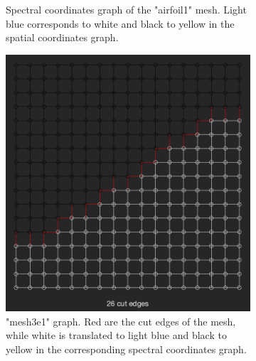 \documentclass[unicode,11pt,a4paper,oneside,numbers=endperiod,openany]{scrartcl}
\begin{document}
\begin{figure}[H]
\begin{subfigure}[b]{0.475\textwidth}
            {{\small Spectral coordinates graph of the "airfoil1" mesh.  Light blue corresponds to white and black to yellow in the spatial coordinates graph.}}    
        \end{subfigure}
\label{figure:ex61meshes}
    \end{figure}

\begin{figure}[H]
        \centering
\begin{subfigure}[b]{0.475\textwidth}   
            \centering 
            \includegraphics[width=\textwidth]{mesh3e1.png}
            {{\small "mesh3e1" graph. Red are the cut edges of the mesh, while white is translated to light blue and black to yellow in the corresponding spectral coordinates graph.}}    
        \end{subfigure}
        \hfill
        \begin{subfigure}[b]{0.475\textwidth}   
            \centering 

\end{subfigure}
\end{figure}
\end{document}

